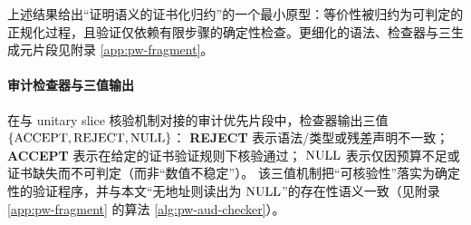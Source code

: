 上述结果给出“证明语义的证书化归约”的一个最小原型：等价性被归约为可判定的正规化过程，且验证仅依赖有限步骤的确定性检查。更细化的语法、检查器与三生成元片段见附录 \ref{app:pw-fragment}。

\paragraph{审计检查器与三值输出}
在与 unitary slice 核验机制对接的审计优先片段中，检查器输出三值
$
\{\mathrm{ACCEPT},\mathrm{REJECT},\mathrm{NULL}\}
$：
\textbf{REJECT} 表示语法/类型或残差声明不一致；
\textbf{ACCEPT} 表示在给定的证书验证规则下核验通过；
\textbf{$\mathrm{NULL}$} 表示仅因预算不足或证书缺失而不可判定（而非“数值不稳定”）。
该三值机制把“可核验性”落实为确定性的验证程序，并与本文“无地址则读出为 $\mathrm{NULL}$”的存在性语义一致（见附录 \ref{app:pw-fragment} 的算法 \ref{alg:pw-aud-checker}）。

